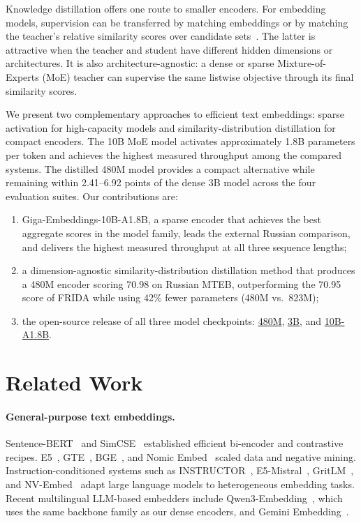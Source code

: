 \documentclass{article}
\begin{document}
Knowledge distillation offers one route to smaller encoders.
For embedding models, supervision can be transferred by matching embeddings or by matching the teacher's relative similarity scores over candidate sets~\citep{reimers2020multilingual,xu2023distillcse,zhao2026kalm}.
The latter is attractive when the teacher and student have different hidden dimensions or architectures.
It is also architecture-agnostic: a dense or sparse Mixture-of-Experts (MoE) teacher can supervise the same listwise objective through its final similarity scores.

We present two complementary approaches to efficient text embeddings: sparse activation for high-capacity models and similarity-distribution distillation for compact encoders.
The 10B MoE model activates approximately 1.8B parameters per token and achieves the highest measured throughput among the compared systems.
The distilled 480M model provides a compact alternative while remaining within 2.41--6.92 points of the dense 3B model across the four evaluation suites.
Our contributions are:
\begin{enumerate}
  \item Giga-Embeddings-10B-A1.8B, a sparse encoder that achieves the best aggregate scores in the model family, leads the external Russian comparison, and delivers the highest measured throughput at all three sequence lengths;
  \item a dimension-agnostic similarity-distribution distillation method that produces a 480M encoder scoring 70.98 on Russian MTEB, outperforming the 70.95 score of FRIDA while using 42\% fewer parameters (480M vs.\ 823M);
  \item the open-source release of all three model checkpoints: \href{https://huggingface.co/ai-sage/Giga-Embeddings-instruct-480M-0826}{480M}, \href{https://huggingface.co/ai-sage/Giga-Embeddings-instruct-3B-0826}{3B}, and \href{https://huggingface.co/ai-sage/Giga-Embeddings-instruct-10B-A1.8B-0826}{10B-A1.8B}.
\end{enumerate}

\section{Related Work}
\label{sec:related}

\paragraph{General-purpose text embeddings.}
Sentence-BERT~\citep{reimers2019sentence} and SimCSE~\citep{gao2021simcse} established efficient bi-encoder and contrastive recipes.
E5~\citep{wang2022text}, GTE~\citep{li2023towards}, BGE~\citep{xiao2023cpack}, and Nomic Embed~\citep{nussbaum2024nomic} scaled data and negative mining.
Instruction-conditioned systems such as INSTRUCTOR~\citep{su2023instructor}, E5-Mistral~\citep{wang2024improving}, GritLM~\citep{muennighoff2025gritlm}, and NV-Embed~\citep{lee2025nvembed} adapt large language models to heterogeneous embedding tasks.
Recent multilingual LLM-based embedders include Qwen3-Embedding~\citep{zhang2025qwen3embedding}, which uses the same backbone family as our dense encoders, and Gemini Embedding~\citep{lee2025gemini}.
\end{document}
